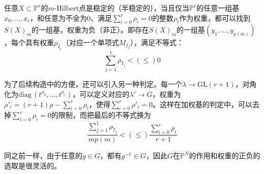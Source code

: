 \begin{theorem}
	任意$ X\subset \mathbb{P}^r $的$ m $-Hilbert点是稳定的（半稳定的），当且仅当$ \mathbb{P}^r $的任意一组基$ x_0,\ldots,x_r $，和任意为不全为$ 0 $、满足$ \sum_{i=0}^{r}\rho_i=0 $的整数$ \rho_i $作为权重，都可以找到$ S(X)_m $的一组基，权重为负（非正）。即存在$ S(X)_m $的一组基$ (y_1,\ldots,y_{p(m)}) $，每个具有权重$ \rho_{I_j} $（对应一个单项式$ M_{I_j} $），满足不等式：
	$$ \sum_{j=1}^{1}\rho_{I_j}<(\leqslant)0 $$
\end{theorem}
为了后续构造中的方便，还可以引入另一种判定。每一个$ \lambda \to \mathrm{GL}(r+1) $，对角化为$ \mathrm{diag}\,(t^{\rho_0},\ldots,t^{\rho_r}) $，可以定义对应的$ \lambda'\to G $，权重为$ \rho'_i=(r+1)\rho-\sum_{i=0}^{r}\rho_i $，使得$ \sum_{i=0}^{r}\rho'_i=0 $。这样在加权基的判定中，可以去掉$ \sum_{i=0}^{r}\rho_i=0 $的限制，而把最后的不等式换为
$$ \frac{\sum_{j=1}^{1}\rho_{I_j}}{mp(m)}<(\leqslant)\frac{\sum_{i=0}^{r}\rho_i}{r+1} $$

同之前一样，由于任意的$ g\in G $，都有$ g^{-1}\in G $，因此$ G $在$ \mathbb{P}^N $的作用和权重的正负的选取是很灵活的。

